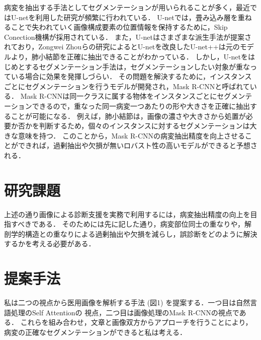 \documentclass[a4j,10pt,twocolumn]{jarticle}
\begin{document}
病変を抽出する手法としてセグメンテーションが用いられることが多く，最近ではU-netを利用した研究が頻繁に行われている\cite{近藤堅司2018u}．
U-netでは，畳み込み層を重ねることで失われていく画像構成要素の位置情報を保持するために，Skip Conection機構が採用されている．
また，U-netはさまざまな派生手法が提案されており，Zongwei Zhouらの研究によるとU-netを改良したU-net++\cite{zhou2018unet++}は元のモデルより，肺小結節を正確に抽出できることがわかっている．
しかし，U-netをはじめとするセグメンテーション手法は，セグメンテーションしたい対象が重なっている場合に効果を発揮しづらい．
その問題を解決するために，インスタンスごとにセグメンテーションを行うモデルが開発され，Mask R-CNNと呼ばれている\cite{he2017mask}．
Mask R-CNNは同一クラスに属する物体をインスタンスごとにセグメンテーションできるので，重なった同一病変一つあたりの形や大きさを正確に抽出することが可能になる．
例えば，肺小結節は，画像の濃さや大きさから処置が必要か否かを判断するため，個々のインスタンスに対するセグメンテーションは大きな意味を持つ．
このことから，Mask R-CNNの病変抽出精度を向上させることができれば，過剰抽出や欠損が無いロバスト性の高いモデルができると予想される．

\section{研究課題}
上述の通り画像による診断支援を実務で利用するには，病変抽出精度の向上を目指すべきである．
そのためには先に記した通り，病変部位同士の重なりや，解剖学的構造との重なりによる過剰抽出や欠損を減らし，誤診断をどのように解決するかを考える必要がある．


\section{提案手法}
私は二つの視点から医用画像を解析する手法 (図1) を提案する．一つ目は自然言語処理のSelf Attention\cite{vaswani2017attention}の
視点，二つ目は画像処理のMask R-CNNの視点である．
これらを組み合わせ，文章と画像双方からアプローチを行うことにより，病変の正確なセグメンテーションができると私は考える．
\end{document}
